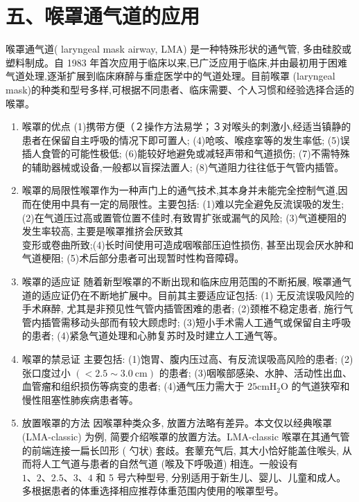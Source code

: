 \documentclass[10pt]{article}
\begin{document}
\section*{五、喉罩通气道的应用}
喉罩通气道( laryngeal mask airway, LMA) 是一种特殊形状的通气管, 多由硅胶或塑料制成。自 1983 年首次应用于临床以来,已广泛应用于临床,并由最初用于困难气道处理,逐渐扩展到临床麻醉与重症医学中的气道处理。目前喉罩 (laryngeal mask)的种类和型号多样,可根据不同患者、临床需要、个人习惯和经验选择合适的喉罩。

\begin{enumerate}
  \item 喉罩的优点 (1)携带方便（２操作方法易学；３对喉头的刺激小,经适当镇静的患者在保留自主呼吸的情况下即可置人; (4)呛咳、喉痉挛等的发生率低; (5)误插人食管的可能性极低; (6)能较好地避免或减轻声带和气道损伤; (7)不需特殊的辅助器械或设备,一般都以盲探法置人; (8)气道阻力往往低于气管内插管。

  \item 喉罩的局限性喉罩作为一种声门上的通气技术,其本身并未能完全控制气道,因而在使用中具有一定的局限性。主要包括: (1)难以完全避免反流误吸的发生; (2)在气道压过高或置管位置不佳时,有致胃扩张或漏气的风险; (3)气道梗阻的发生率较高, 主要是喉罩推挤会厌致其\\
变形或卷曲所致;(4)长时间使用可造成咽喉部压迫性损伤, 甚至出现会厌水肿和气道梗阻; (5)术后部分患者可出现暂时性构音障碍。

  \item 喉罩的适应证 随着新型喉罩的不断出现和临床应用范围的不断拓展, 喉罩通气道的适应证仍在不断地扩展中。目前其主要适应证包括: (1) 无反流误吸风险的手术麻醉, 尤其是非预见性气管内插管困难的患者; (2)颈椎不稳定患者, 施行气管内插管需移动头部而有较大顾虑时; (3)短小手术需人工通气或保留自主呼吸的患者; (4)紧急气道处理和心肺复苏时及时建立人工通气等。

  \item 喉罩的禁忌证 主要包括: (1)饱胃、腹内压过高、有反流误吸高风险的患者; (2)张口度过小 $(<2.5 \sim 3.0 \mathrm{~cm})$ 的患者; (3)咽喉部感染、水肿、活动性出血、血管瘤和组织损伤等病变的患者; (4)通气压力需大于 $25 \mathrm{cmH}_{2} \mathrm{O}$ 的气道狭窄和慢性阻塞性肺疾病患者等。

  \item 放置喉罩的方法 因喉罩种类众多, 放置方法略有差异。本文仅以经典喉罩 (LMA-classic) 为例, 简要介绍喉罩的放置方法。LMA-classic 喉罩在其通气管的前端连接一扁长凹形 ( 勺状) 套歧。套䕉充气后, 其大小恰好能盖住喉头, 从而将人工气道与患者的自然气道 (喉及下呼吸道) 相连。一般设有 $1 、 2 、 2.5 、 3 、 4$ 和 5 号六种型号, 分别适用于新生儿、婴儿、儿童和成人。多根据患者的体重选择相应推荐体重范围内使用的喉罩型号。

\end{enumerate}
\end{document}
